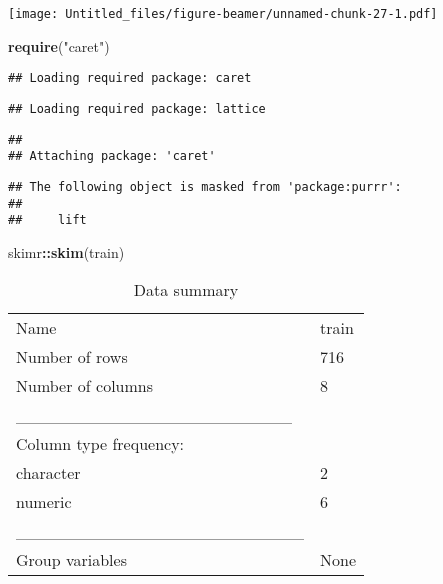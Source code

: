 \documentclass[ignorenonframetext,]{beamer}
\newenvironment{Shaded}{\begin{snugshade}}{\end{snugshade}}
\newcommand{\DataTypeTok}[1]{\textcolor[rgb]{0.13,0.29,0.53}{#1}}
\newcommand{\DecValTok}[1]{\textcolor[rgb]{0.00,0.00,0.81}{#1}}
\newcommand{\KeywordTok}[1]{\textcolor[rgb]{0.13,0.29,0.53}{\textbf{#1}}}
\newcommand{\NormalTok}[1]{#1}
\newcommand{\OperatorTok}[1]{\textcolor[rgb]{0.81,0.36,0.00}{\textbf{#1}}}
\newcommand{\StringTok}[1]{\textcolor[rgb]{0.31,0.60,0.02}{#1}}
\begin{document}
\begin{frame}[fragile]
\texttt{[image: Untitled\_files/figure-beamer/unnamed-chunk-27-1.pdf]}

\begin{Shaded}
\begin{Highlighting}[]
\KeywordTok{require}\NormalTok{(}\StringTok{"caret"}\NormalTok{)}
\end{Highlighting}
\end{Shaded}

\begin{verbatim}
## Loading required package: caret
\end{verbatim}

\begin{verbatim}
## Loading required package: lattice
\end{verbatim}

\begin{verbatim}
## 
## Attaching package: 'caret'
\end{verbatim}

\begin{verbatim}
## The following object is masked from 'package:purrr':
## 
##     lift
\end{verbatim}

\begin{Shaded}
\end{Shaded}

\begin{Shaded}
\begin{Highlighting}[]
\NormalTok{skimr}\OperatorTok{::}\KeywordTok{skim}\NormalTok{(train)}
\end{Highlighting}
\end{Shaded}

\begin{longtable}[]{@{}ll@{}}
\caption{Data summary}\tabularnewline
\toprule
\endhead
Name & train\tabularnewline
Number of rows & 716\tabularnewline
Number of columns & 8\tabularnewline
\_\_\_\_\_\_\_\_\_\_\_\_\_\_\_\_\_\_\_\_\_\_\_ &\tabularnewline
Column type frequency: &\tabularnewline
character & 2\tabularnewline
numeric & 6\tabularnewline
\_\_\_\_\_\_\_\_\_\_\_\_\_\_\_\_\_\_\_\_\_\_\_\_ &\tabularnewline
Group variables & None\tabularnewline
\bottomrule
\end{longtable}


\end{frame}
\end{document}
